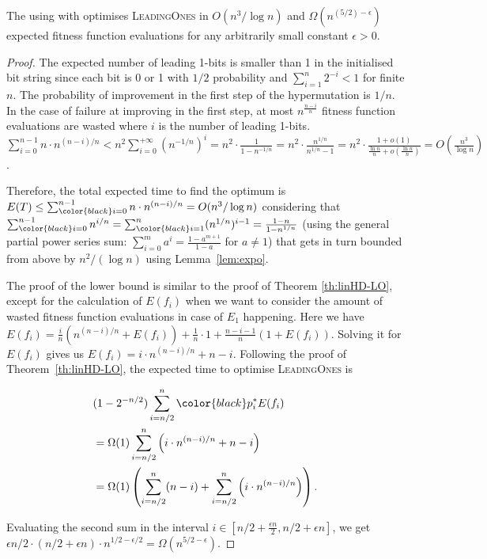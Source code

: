 
\begin{theorem} \label{expohdOnLO}
	The {\oneoneIA } using \IPHfcm{} with {\expoF } optimises \textsc{LeadingOnes} in $O(n^3/\log n)$ and 
	$\Omega(n^{(5/2)-\epsilon})$  expected fitness function evaluations for any 
	arbitrarily small constant $\epsilon>0$. 
\end{theorem}

\begin{proof}
	{\color{black} The expected number of leading 1-bits is smaller than 1 in the initialised bit 
		string since each bit is 0 or 1 with $1/2$ probability and $\sum^{n}_{i=1}2^{-i}<1$ for finite $n$.} %
	The probability of improvement in the first step {\color{black} of the hypermutation} is $1/n$. In the case of 
	failure at improving in the first step, at most $n^{\frac{n-i}{n}}$ fitness 
	function evaluations are wasted where $i$ is the number of leading 
	1-bits. {\color{black}$\sum_{i = 0}^{n - 1} n \cdot n^{(n - i) / n} < n^2 \sum_{i = 0}^{+\infty}(n^{-1/n})^i = n^2 \cdot \frac{1}{1 - n^{-1/n}} = n^2 \cdot \frac{n^{1/n}}{n^{1/n} - 1} = n^2 \cdot \frac{1 + o(1)}{\frac{\ln{n}}{n} + o(\frac{\ln{n}}{n})} = O(\frac{n^3}{\log{n}})$. }
	
	Therefore, the total expected time to find the optimum is  $E(T) \leq 
	\sum_{{\color{black}i=0}}^{n-1} n \cdot n^{(n-i)/n}=O( n^3/\log n)$ considering that $ 
	\sum_{{\color{black}i=0}}^{n-1} n^{i/n}= \sum_{{\color{black}i=1}}^n (n^{1/n})^{i-1}=\frac{1-n}{1-n^{1/n}}$ (using the general partial power series sum: $\sum_{i=0}^{m}a^{i}=\frac{1-a^{m+1}}{1-a}$ for $a\neq 1$)  that gets in turn bounded from above by $n^2/(\log n)$ using Lemma~\ref{lem:expo}.
	
	
	The proof of the lower bound is similar to the proof of Theorem \ref{th:linHD-LO}, except for the calculation of $E(f_i)$ when we want to consider the amount of wasted fitness function evaluations in case of $E_1$ happening. Here we have $ E(f_i) = \frac{i}{n} \left( n^{(n-i)/n}+ E(f_i)\right) + \frac{1}{n} \cdot 1 +\frac{n-i-1}{n} \left( 1+ E(f_i)\right)$. Solving it for $E(f_i)$ gives us $E(f_i)=i\cdot n^{(n-i)/n}+n-i$. 
	{\color{black}Following the proof of Theorem~\ref{th:linHD-LO}}, the expected time to optimise \textsc{LeadingOnes} is 
	
	\begin{align*}
		&(1-2^{-n/2})\sum_{i=n/2}^{n} {\color{black}p_{i}^{*}} E(f_i)\\
		&=\Omega(1) \sum_{i=n/2}^{n} 
		\left(i\cdot n^{(n-i)/n}+n-i \right)\\
		&=\Omega(1)\left( \sum_{i=n/2}^{n} (n-i)+ 
		\sum_{i=n/2}^{n} \left(i\cdot n^{(n-i)/n}\right)\right). 
	\end{align*}
	
	Evaluating the second 
	sum in the interval $i\in [n/2+\frac{\epsilon n}{2}, n/2+\epsilon n]$, we get $\epsilon 
	n/2 \cdot (n/2 + \epsilon n)  \cdot 
	n^{1/2-\epsilon/2}=\Omega(n^{5/2-\epsilon})$.
\end{proof}
